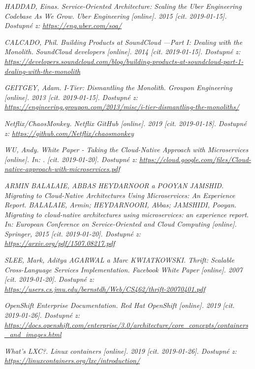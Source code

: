 \begin{thebibliography}{10}
	\emph{HADDAD, Einas. Service-Oriented Architecture: Scaling the Uber Engineering Codebase As We Grow. Uber Engineering [online]. 2015 [cit. 2019-01-15]. Dostupné z: \url{https://eng.uber.com/soa/}}

	\emph{CALCADO, Phil. Building Products at SoundCloud —Part I: Dealing with the Monolith. SoundCloud developers [online]. 2014 [cit. 2019-01-15]. Dostupné z: \url{https://developers.soundcloud.com/blog/building-products-at-soundcloud-part-1-dealing-with-the-monolith}}


	\emph{GEITGEY, Adam. I-Tier: Dismantling the Monolith. Groupon Engineering [online]. 2013 [cit. 2019-01-15]. Dostupné z: \url{https://engineering.groupon.com/2013/misc/i-tier-dismantling-the-monoliths/}}

	\emph{Netflix/ChaosMonkey. Netflix GitHub [online]. 2019 [cit. 2019-01-18]. Dostupné z: \url{https://github.com/Netflix/chaosmonkey}}

	\emph{WU, Andy. White Paper - Taking the Cloud-Native Approach with Microservices [online]. In: . [cit. 2019-01-20]. Dostupné z: \url{https://cloud.google.com/files/Cloud-native-approach-with-microservices.pdf}}

	\emph{ARMIN BALALAIE, ABBAS HEYDARNOOR a POOYAN JAMSHID. Migrating to Cloud-Native Architectures Using Microservices: An Experience Report. BALALAIE, Armin; HEYDARNOORI, Abbas; JAMSHIDI, Pooyan. Migrating to cloud-native architectures using microservices: an experience report. In: European Conference on Service-Oriented and Cloud Computing [online]. Springer, 2015 [cit. 2019-01-20]. Dostupné z: \url{https://arxiv.org/pdf/1507.08217.pdf}}

	\emph{SLEE, Mark, Aditya AGARWAL a Marc KWIATKOWSKI. Thrift: Scalable Cross-Language Services Implementation. Facebook White Paper [online]. 2007 [cit. 2019-01-20]. Dostupné z: \url{https://users.cs.jmu.edu/bernstdh/Web/CS462/thrift-20070401.pdf}}

	\emph{OpenShift Enterprise Documentation. Red Hat OpenShift [online]. 2019 [cit. 2019-01-26]. Dostupné z: \url{https://docs.openshift.com/enterprise/3.0/architecture/core_concepts/containers_and_images.html}}

	\emph{What's LXC?. Linux containers [online]. 2019 [cit. 2019-01-26]. Dostupné z: \url{https://linuxcontainers.org/lxc/introduction/}}


\end{thebibliography}
